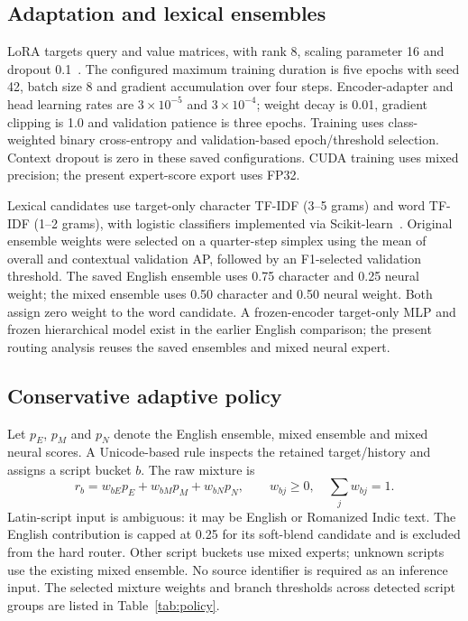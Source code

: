 \documentclass[11pt,a4paper]{article}
\begin{document}
\subsection{Adaptation and lexical ensembles}
LoRA targets query and value matrices, with rank 8, scaling parameter 16 and dropout 0.1~\citep{hu2021}. The configured maximum training duration is five epochs with seed 42, batch size 8 and gradient accumulation over four steps. Encoder-adapter and head learning rates are $3\times10^{-5}$ and $3\times10^{-4}$; weight decay is 0.01, gradient clipping is 1.0 and validation patience is three epochs. Training uses class-weighted binary cross-entropy and validation-based epoch/threshold selection. Context dropout is zero in these saved configurations. CUDA training uses mixed precision; the present expert-score export uses FP32.

Lexical candidates use target-only character TF-IDF (3--5 grams) and word TF-IDF (1--2 grams), with logistic classifiers implemented via Scikit-learn~\citep{pedregosa2011}. Original ensemble weights were selected on a quarter-step simplex using the mean of overall and contextual validation AP, followed by an F1-selected validation threshold. The saved English ensemble uses 0.75 character and 0.25 neural weight; the mixed ensemble uses 0.50 character and 0.50 neural weight. Both assign zero weight to the word candidate. A frozen-encoder target-only MLP and frozen hierarchical model exist in the earlier English comparison; the present routing analysis reuses the saved ensembles and mixed neural expert.

\subsection{Conservative adaptive policy}
Let $p_E$, $p_M$ and $p_N$ denote the English ensemble, mixed ensemble and mixed neural scores. A Unicode-based rule inspects the retained target/history and assigns a script bucket $b$. The raw mixture is
\begin{equation}
r_b=w_{bE}p_E+w_{bM}p_M+w_{bN}p_N,\qquad w_{bj}\geq0,\quad\sum_j w_{bj}=1.
\end{equation}
Latin-script input is ambiguous: it may be English or Romanized Indic text. The English contribution is capped at 0.25 for its soft-blend candidate and is excluded from the hard router. Other script buckets use mixed experts; unknown scripts use the existing mixed ensemble. No source identifier is required as an inference input. The selected mixture weights and branch thresholds across detected script groups are listed in Table~\ref{tab:policy}.
\end{document}
